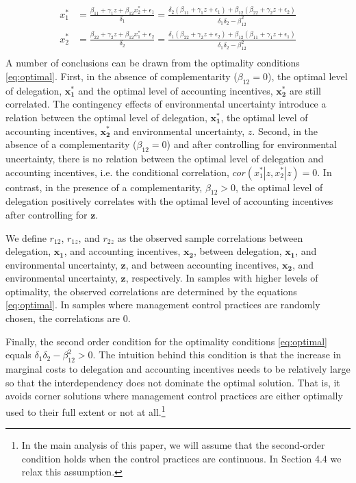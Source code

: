\documentclass[12pt]{article}
\begin{document}
\begin{equation}\label{eq:optimal}
\begin{aligned}
x_1^* &= \frac{\beta_{11} + \gamma_1 z + \beta_{12} x_2^*  + \epsilon_{1}}{\delta_1 }
		      = \frac{\delta_2 (\beta_{11} + \gamma_1 z + \epsilon_1) 
           					+ \beta_{12} (\beta_{22} + \gamma_2 z + \epsilon_2) }
                            {\delta_1 \delta_2 - \beta_{12}^2} \\
 x_2^* &= \frac{\beta_{22} + \gamma_2 z + \beta_{12} x_1^* + \epsilon_{2}}{\delta_2  }
		      =  \frac{\delta_1 (\beta_{22} + \gamma_2 z + \epsilon_2) 
           					+ \beta_{12} (\beta_{11} + \gamma_1 z + \epsilon_1) }
                            {\delta_1 \delta_2 - \beta_{12}^2} \\
\end{aligned}
\end{equation}
A number of conclusions can be drawn from the optimality conditions \eqref{eq:optimal}. First, in the absence of complementarity ($\beta_{12}=0$), the optimal level of delegation, $\mathbf{x^*_1}$ and the optimal level of accounting incentives, $\mathbf{x^*_2}$ are still correlated. The contingency effects of environmental uncertainty introduce a relation between the optimal level of delegation, $\mathbf{x^*_1}$, the optimal level of accounting incentives, $\mathbf{x^*_2}$ and environmental uncertainty, $z$. Second, in the absence of a complementarity ($\beta_{12} = 0$) and after controlling for environmental uncertainty, there is no relation between the optimal level of delegation and accounting incentives, i.e. the conditional correlation, $cor(x^*_1 | z, x^*_2 |z) = 0$.  In contrast, in the presence of a complementarity, $\beta_{12} > 0$, the optimal level of delegation positively correlates with the optimal level of accounting incentives after controlling for $\mathbf{z}$. 

We define $r_{12}$, $r_{1z}$, and $r_{2z}$ as the observed sample correlations between delegation, $\mathbf{x_1}$, and accounting incentives, $\mathbf{x_2}$,  between delegation, $\mathbf{x_1}$, and environmental uncertainty, $\mathbf{z}$, and between accounting incentives, $\mathbf{x_2}$, and environmental uncertainty, $\mathbf{z}$, respectively. In samples with higher levels of optimality, the observed correlations are determined by the equations \eqref{eq:optimal}.  In samples where management control practices are randomly chosen, the correlations are $0$. 

Finally, the second order condition for the optimality conditions \eqref{eq:optimal} equals $\delta_1 \delta_2 - \beta_{12}^2 > 0$. The intuition behind this condition is that the increase in marginal costs to delegation and accounting incentives needs to be relatively large so that the interdependency does not dominate the optimal solution. That is, it avoids corner solutions where management control practices are either optimally used to their full extent or not at all.\footnote{In the main analysis of this paper, we will assume that the second-order condition holds when the control practices are continuous. In Section 4.4 we relax this assumption.}
\end{document}
